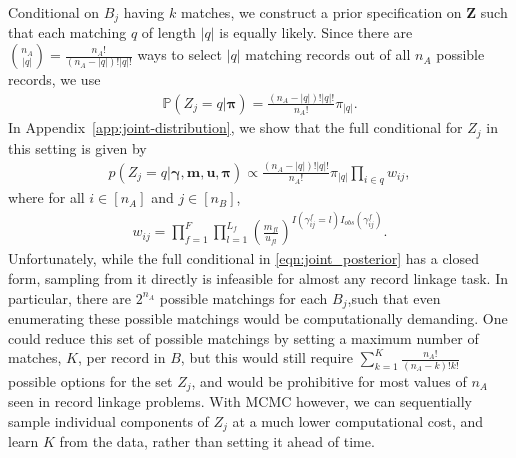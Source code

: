 \documentclass[12pt,letterpaper]{article}
\newcommand{\1}[1]{\mathbb{I}\!\left[#1\right]} %
\begin{document}
Conditional on $B_j$ having $k$ matches, we construct a prior specification on $\bm{Z}$ such that each matching $q$ of length $|q|$ is equally likely. Since there are ${n_A \choose |q|} = \frac{n_A!}{(n_A - |q|)! |q|!}$ ways to select $|q|$ matching records out of all $n_A$ possible records, we use
\begin{align}
	\mathbb{P}(Z_j = q| \bm{\pi}) = \frac{(n_A - |q|)! |q|!}{n_A!} \pi_{|q|}. \label{eqn:z_drl}
\end{align}
In Appendix~\ref{app:joint-distribution}, we show that the full conditional for $Z_j$ in this setting is given by
\begin{align}
		p\left(Z_j  = q|\bm{\gamma}, \bm{m}, \bm{u}, \bm{\pi} \right) \propto \frac{(n_A - |q|)!|q|!}{n_A!} \pi_{|q|} \prod_{i \in q} w_{ij}, \label{eqn:joint_posterior}
\end{align}
where for all $i \in [n_A]$ and $j \in [n_B]$, 
\begin{align}
	w_{ij} = \prod_{f=1}^{F}\prod_{l = 1}^{L_f} \left(\frac{m_{fl}}{u_{fl}}\right)^{I(\gamma_{ij}^f = l)I_{obs}(\gamma_{ij}^f)} \label{eqn:fs_weight}.
\end{align}
Unfortunately, while the full conditional in \eqref{eqn:joint_posterior} has a closed form, sampling from it directly is infeasible for almost any record linkage task. In particular, there are $2^{n_A}$ possible matchings for each $B_j$,such that even enumerating these possible matchings would be computationally demanding. One could reduce this set of possible matchings by setting a maximum number of matches, $K$, per record in $B$, but this would still require $\sum_{k = 1}^K \frac{n_A!}{(n_A - k)!k!}$ possible options for the set $Z_j$, and would be prohibitive for most values of $n_A$ seen in record linkage problems. With MCMC however, we can sequentially sample individual components of $Z_j$ at a much lower computational cost, and learn $K$ from the data, rather than setting it ahead of time. 

\end{document}
